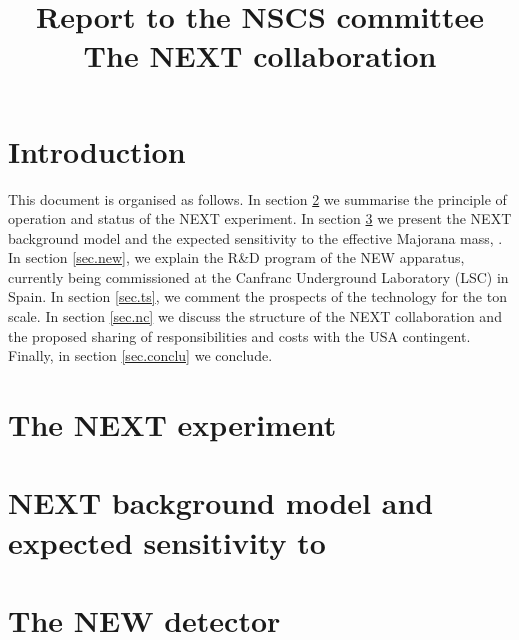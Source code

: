\documentclass[a4paper, 11pt]{article}
\begin{document}


\title{\Huge{\sf Report to the NSCS committee}\\ \vspace{.5cm}
\LARGE{The NEXT collaboration} 
\vspace{.5cm}}


\date{ } %
\maketitle
\thispagestyle{empty}
\clearpage

\setcounter{page}{1}

\section{Introduction}


This document is organised as follows. 
In section \ref{sec.next} we summarise the principle of operation and status of the NEXT experiment. In section \ref{sec.bm} we present the NEXT background model and the expected sensitivity to the effective Majorana mass, \mbb.  In section \ref{sec.new}, we explain the R\&D program of the NEW apparatus, currently being commissioned at the Canfranc Underground Laboratory (LSC) in Spain. In section \ref{sec.ts}, we comment the prospects of the technology for the ton scale. In section \ref{sec.nc} we discuss the structure of the NEXT collaboration and the proposed sharing of responsibilities and costs with the USA contingent.  Finally, in section \ref{sec.conclu} we conclude.

\section{The NEXT experiment}
\label{sec.next}


\section{NEXT background model and expected sensitivity to \mbb} 
\label{sec.bm}






\section{\label{sec.new}The NEW detector}

\end{document}
